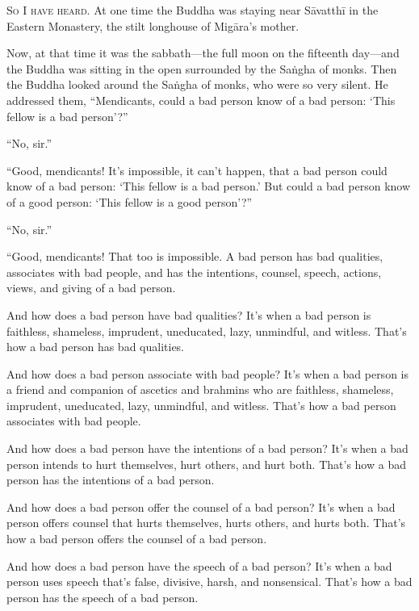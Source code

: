 \documentclass[12pt,openany]{book}%
\newcommand*{\scevam}[1]{\textsc{#1}}
\begin{document}
\scevam{So I have heard. }At one time the Buddha was staying near \textsanskrit{Sāvatthī} in the Eastern Monastery, the stilt longhouse of \textsanskrit{Migāra}’s mother. 

Now, at that time it was the sabbath—the full moon on the fifteenth day—and the Buddha was sitting in the open surrounded by the \textsanskrit{Saṅgha} of monks. Then the Buddha looked around the \textsanskrit{Saṅgha} of monks, who were so very silent. He addressed them, “Mendicants, could a bad person know of a bad person: ‘This fellow is a bad person’?” 

“No, sir.” 

“Good, mendicants! It’s impossible, it can’t happen, that a bad person could know of a bad person: ‘This fellow is a bad person.’ But could a bad person know of a good person: ‘This fellow is a good person’?” 

“No, sir.” 

“Good, mendicants! That too is impossible. A bad person has bad qualities, associates with bad people, and has the intentions, counsel, speech, actions, views, and giving of a bad person. 

And how does a bad person have bad qualities? It’s when a bad person is faithless, shameless, imprudent, uneducated, lazy, unmindful, and witless. That’s how a bad person has bad qualities. 

And how does a bad person associate with bad people? It’s when a bad person is a friend and companion of ascetics and brahmins who are faithless, shameless, imprudent, uneducated, lazy, unmindful, and witless. That’s how a bad person associates with bad people. 

And how does a bad person have the intentions of a bad person? It’s when a bad person intends to hurt themselves, hurt others, and hurt both. That’s how a bad person has the intentions of a bad person. 

And how does a bad person offer the counsel of a bad person? It’s when a bad person offers counsel that hurts themselves, hurts others, and hurts both. That’s how a bad person offers the counsel of a bad person. 

And how does a bad person have the speech of a bad person? It’s when a bad person uses speech that’s false, divisive, harsh, and nonsensical. That’s how a bad person has the speech of a bad person. 
\end{document}
